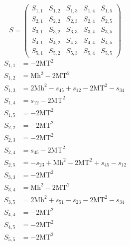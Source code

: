 \documentclass[a4paper]{article}
\begin{document}
\begin{equation}
S=\left(\begin{array}{ccccc}
   S_{1,1}&
   S_{1,2}&
   S_{1,3}&
   S_{1,4}&
   S_{1,5}\\
   S_{2,1}&
   S_{2,2}&
   S_{2,3}&
   S_{2,4}&
   S_{2,5}\\
   S_{3,1}&
   S_{3,2}&
   S_{3,3}&
   S_{3,4}&
   S_{3,5}\\
   S_{4,1}&
   S_{4,2}&
   S_{4,3}&
   S_{4,4}&
   S_{4,5}\\
   S_{5,1}&
   S_{5,2}&
   S_{5,3}&
   S_{5,4}&
   S_{5,5}\end{array}\right)
\end{equation}
\begin{subequations}
\begin{align}
   S_{1,1}&=-2\text{MT}^2\\
   S_{1,2}&=\text{Mh}^2-2\text{MT}^2\\
   S_{1,3}&=2\text{Mh}^2-s_{45}+s_{12}-2\text{MT}^2-s_{34}\\
   S_{1,4}&=s_{12}-2\text{MT}^2\\
   S_{1,5}&=-2\text{MT}^2\\
   S_{2,2}&=-2\text{MT}^2\\
   S_{2,3}&=-2\text{MT}^2\\
   S_{2,4}&=s_{45}-2\text{MT}^2\\
   S_{2,5}&=-s_{23}+\text{Mh}^2-2\text{MT}^2+s_{45}-s_{12}\\
   S_{3,3}&=-2\text{MT}^2\\
   S_{3,4}&=\text{Mh}^2-2\text{MT}^2\\
   S_{3,5}&=2\text{Mh}^2+s_{51}-s_{23}-2\text{MT}^2-s_{34}\\
   S_{4,4}&=-2\text{MT}^2\\
   S_{4,5}&=-2\text{MT}^2\\
   S_{5,5}&=-2\text{MT}^2
\end{align}
\end{subequations}
\end{document}
